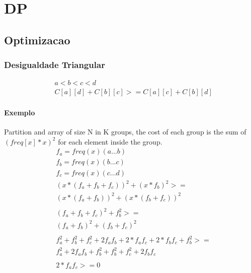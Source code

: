 \chapter{DP}

\section{Optimizacao}
\subsection{Desigualdade Triangular}
\begin{align*}
	&a < b < c < d \\
	&C[a][d] + C[b][c] >= C[a][c] + C[b][d]
\end{align*}
\subsubsection{Exemplo}
 Partition and array of size N in K groups, the cost of each group is the sum of $(freq[x] * x)^2$ 
for each element inside the group.
\begin{align*}
	&f_a = freq(x)(a...b) \\
	&f_b = freq(x)(b...c) \\
	&f_c = freq(x)(c...d) \\
	&(x * (f_a + f_b + f_c))^2 + (x * f_b)^2 >= \\
	&(x * (f_a + f_b))^2 + (x * (f_b + f_c))^2 \\
	\\
	&(f_a + f_b + f_c)^2 + f_b^2 >= \\
	&(f_a + f_b)^2 + (f_b + f_c)^2 \\
	\\
	& f_a^2 + f_b^2 + f_c^2 + 2f_af_b + 2*f_af_c + 2*f_bf_c + f_b^2 >= \\
	&f_a^2 + 2f_af_b + f_b^2 + f_b^2 + f_c^2 + 2f_bf_c\\
	\\
	& 2*f_af_c >= 0
\end{align*}

